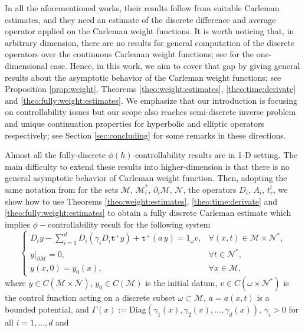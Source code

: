 \documentclass[11pt,oneside,leqno]{amsart}
\numberwithin{equation}{section}
\numberwithin{equation}{section}
\newcommand{\trp}{\mathtt t^+}
\begin{document}
\par In all the aforementioned works, their results follow from suitable Carleman estimates, and they need an estimate of the discrete difference and average operator applied on the Carleman weight functions. It is worth noticing that, in arbitrary dimension, there are no results for general computation of the discrete operators over the continuous Carleman weight functions; see \cite{LOP-2020} for the one-dimensional case. Hence, in this work, we aim to cover that gap by giving general results about the asymptotic behavior of the Carleman weight functions; see Proposition \ref{prop:weight}, Theorems \ref{theo:weight:estimates}, \ref{theo:time:derivate} and \ref{theo:fully:weight:estimates}. We emphasize that our introduction is focusing on controllability issues but our scope also reaches semi-discrete inverse problem and unique continuation properties for hyperbolic and elliptic operators respectively; see Section \ref{sec:concluding} for some remarks in these directions. \\
\par Almost all the fully-discrete $\phi(h)$-controllability results are in 1-D setting. The main difficulty to extend these results into higher-dimension is that there is no general asymptotic behavior of Carleman weight function. Then, adopting the same notation from \cite{LDOP-2021,LPP:2026,LPP:2026b,LLRP:2025} for the sets $\mathcal{M}$, $\mathcal{M}_{i}^{\ast}$, $\partial_{i}\mathcal{M}$, $\mathcal{N}$, the operators $D_{i}$, $A_{i}$, $t_{r}^{i}$, we show how to use Theorems \ref{theo:weight:estimates}, \ref{theo:time:derivate} and \ref{theo:fully:weight:estimates} to obtain a fully discrete Carleman estimate which implies $\phi-$controllability result for the following system
\begin{equation}\label{eq:controlled}
\begin{cases}
D_{t}y-\sum_{i=1}^{d}D_{i}(\gamma_{i}D_{i}\trp y)+\trp(a\,y)=1_{\omega}v,&\forall(x,t)\in\mathcal{M}\times\mathcal{N}^{\ast},\\
y\big|_{\partial\mathcal{M}}=0,&\forall t\in\mathcal{N}^{\ast},\\
y(x,0)=y_{0}(x),&\forall x\in\mathcal{M},
\end{cases}
\end{equation}
where  $y\in C(\overline{\mathcal{M}}\times\overline{\mathcal{N}})$, $y_{0}\in C(\mathcal{M})$ is the initial datum, $v\in C(\omega\times\mathcal{N}^{\ast})$ is the control function acting on a discrete subset $\omega\subset\mathcal{M}$, $a=a(x,t)$ is a bounded potential, and $\Gamma(x):= \mathrm{Diag}(\gamma_{1}(x),\gamma_{2}(x),\ldots, \gamma_{d}(x))$, $\gamma_i>0$ for all $i=1,\ldots,d$ and 
\end{document}
